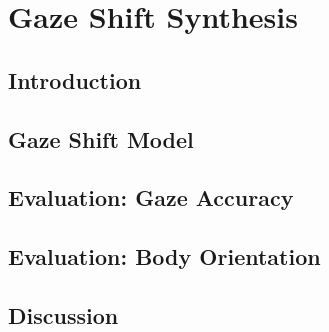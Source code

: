 \pagestyle{deposit}

\chapter{Gaze Shift Synthesis}
\label{cha:GazeShiftModel}

\section{Introduction}
\label{sec:GazeShiftModelIntro}


\section{Gaze Shift Model}
\label{sec:GazeShiftModel}


\section{Evaluation: Gaze Accuracy}
\label{sec:GazeShiftModelEval1}


\section{Evaluation: Body Orientation}
\label{sec:GazeShiftModelEval2}


\section{Discussion}
\label{sec:GazeShiftModelDiscussion}


